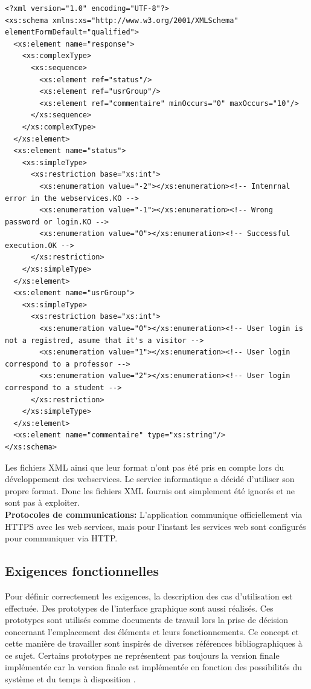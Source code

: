  \begin{lstlisting}[language=XSD,caption = Exemple de XML Schema fournit au service informatique de l'USJ]
<?xml version="1.0" encoding="UTF-8"?>
<xs:schema xmlns:xs="http://www.w3.org/2001/XMLSchema" elementFormDefault="qualified">
  <xs:element name="response">
    <xs:complexType>
      <xs:sequence>
        <xs:element ref="status"/>
        <xs:element ref="usrGroup"/>
        <xs:element ref="commentaire" minOccurs="0" maxOccurs="10"/>
      </xs:sequence>
    </xs:complexType>
  </xs:element>
  <xs:element name="status">
    <xs:simpleType>
      <xs:restriction base="xs:int">
        <xs:enumeration value="-2"></xs:enumeration><!-- Intenrnal error in the webservices.KO -->
        <xs:enumeration value="-1"></xs:enumeration><!-- Wrong password or login.KO -->
        <xs:enumeration value="0"></xs:enumeration><!-- Successful execution.OK -->
      </xs:restriction>
    </xs:simpleType>
  </xs:element>
  <xs:element name="usrGroup">
    <xs:simpleType>
      <xs:restriction base="xs:int">
        <xs:enumeration value="0"></xs:enumeration><!-- User login is not a registred, asume that it's a visitor -->
        <xs:enumeration value="1"></xs:enumeration><!-- User login correspond to a professor -->
        <xs:enumeration value="2"></xs:enumeration><!-- User login correspond to a student -->
      </xs:restriction>
    </xs:simpleType>
  </xs:element>
  <xs:element name="commentaire" type="xs:string"/>
</xs:schema>
			\end{lstlisting}
	Les fichiers XML ainsi que leur format n'ont pas été pris en compte lors du développement des webservices. Le service informatique a décidé d'utiliser son propre format. Donc les fichiers XML fournis ont simplement été ignorés et ne sont pas à exploiter.\\
	\textbf{Protocoles de communications:} L'application communique officiellement via HTTPS avec les web services, mais pour l'instant les services web sont configurés pour communiquer via HTTP. \\[0.2cm]
	
	
	
	\subsection{Exigences fonctionnelles \label{exigenceFoction}}
		Pour définir correctement les exigences, la description des cas d'utilisation est effectuée. Des prototypes de l'interface graphique sont aussi réalisés. Ces prototypes sont utilisés comme documents de travail lors la prise de décision concernant l'emplacement des éléments et leurs fonctionnements. Ce concept et cette manière de travailler sont inspirés de diverses références bibliographiques à ce sujet\cite{bookErgo}.   Certains prototypes ne représentent pas toujours la version finale implémentée car la version finale est implémentée en fonction des possibilités du système et du temps à disposition . 
		
